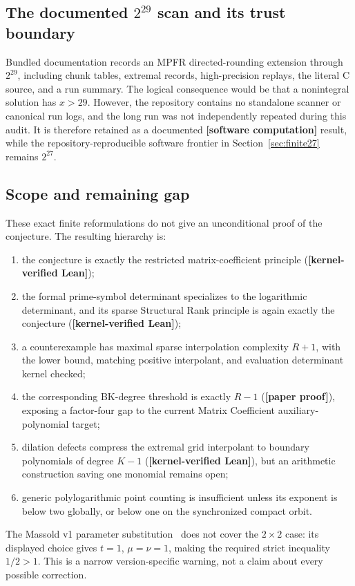 \documentclass[11pt,oneside]{article}
\theoremstyle{definition}
\theoremstyle{remark}
\newcommand{\statuslean}{\textcolor{leanblue}{\textbf{[kernel-verified Lean]}}}
\newcommand{\statusnew}{\textcolor{newgreen}{\textbf{[paper proof]}}}
\newcommand{\statuscomp}{\textcolor{computeviolet}{\textbf{[software computation]}}}
\begin{document}
\subsection{The documented \texorpdfstring{$2^{29}$}{2\^{}29} scan and its trust boundary}
\label{mc:finite29}

Bundled documentation records an MPFR directed-rounding extension through $2^{29}$,
including chunk tables, extremal records, high-precision replays, the literal C source, and a
run summary.  The logical consequence would be that a nonintegral solution has $x>29$.
However, the repository contains no standalone scanner or canonical run logs, and the long
run was not independently repeated during this audit.  It is therefore retained as a
documented \statuscomp{} result,
while the repository-reproducible software frontier in Section~\ref{sec:finite27} remains
$2^{27}$.

\subsection{Scope and remaining gap}

These exact finite reformulations do not give an unconditional proof of the
conjecture.  The resulting hierarchy is:
\begin{enumerate}
\item the conjecture is exactly the restricted matrix-coefficient principle
  (\statuslean);
\item the formal prime-symbol determinant specializes to the logarithmic determinant, and
  its sparse Structural Rank principle is again exactly the conjecture (\statuslean);
\item a counterexample has maximal sparse interpolation complexity $R+1$, with the lower
  bound, matching positive interpolant, and evaluation determinant kernel checked;
\item the corresponding BK-degree threshold is exactly $R-1$ (\statusnew), exposing a
  factor-four gap to the current Matrix Coefficient auxiliary-polynomial target;
\item dilation defects compress the extremal grid interpolant to boundary polynomials of
  degree $K-1$ (\statuslean), but an arithmetic construction saving one monomial remains open;
\item generic polylogarithmic point counting is insufficient unless its exponent is below
  two globally, or below one on the synchronized compact orbit.
\end{enumerate}
The Massold v1 parameter substitution~\cite{Massold2025} does not cover the
$2\times2$ case: its displayed choice gives $t=1$, $\mu=\nu=1$, making the required strict
inequality $1/2>1$.  This is a narrow version-specific warning, not a claim
about every possible correction.
\end{document}
